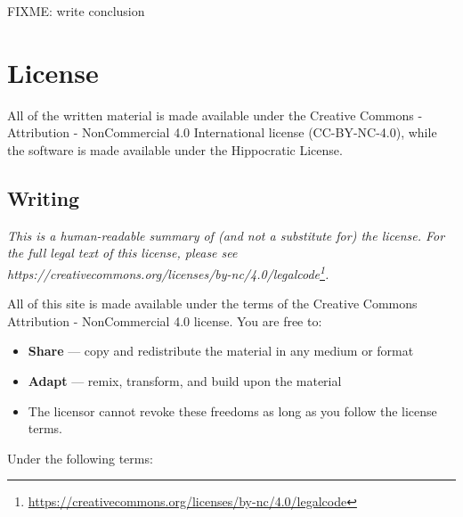 \documentclass[krantzl]{krantz}
\newcommand{\hreffoot}[2]{{#1}\footnote{\href{#2}{#2}}}
\begin{document}
FIXME: write conclusion


\appendix
\chapter{License}\label{license}




All of the written material is made available under the Creative
Commons - Attribution - NonCommercial 4.0 International license (CC-BY-NC-4.0),
while the software is made available under the Hippocratic License.

\section{Writing}

\emph{This is a human-readable summary of (and not a substitute for) the license.
For the full legal text of this license, please see
\hreffoot{https://creativecommons.org/licenses/by-nc/4.0/legalcode}{https://creativecommons.org/licenses/by-nc/4.0/legalcode}.}


All of this site is made available under the terms of the Creative Commons
Attribution - NonCommercial 4.0 license. You are free to:

\begin{itemize}
\item 

\textbf{Share} — copy and redistribute the material in any medium or format



\item 

\textbf{Adapt} — remix, transform, and build upon the material



\item 

The licensor cannot revoke these freedoms as long as you follow the license
    terms.



\end{itemize}

Under the following terms:
\end{document}
